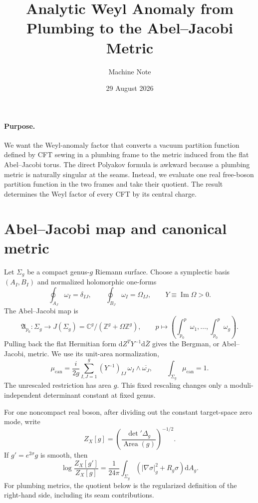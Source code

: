 \documentclass[11pt]{article}
\title{Analytic Weyl Anomaly from Plumbing to the Abel--Jacobi Metric}
\author{Machine Note}
\date{29 August 2026}
\newcommand{\dd}{\mathrm d}
\newcommand{\can}{\mathrm{can}}
\begin{document}
\maketitle

\paragraph{Purpose.}
We want the Weyl-anomaly factor that converts a vacuum partition function
defined by CFT sewing in a plumbing frame to the metric induced from the flat
Abel--Jacobi torus.  The direct Polyakov formula is awkward because a plumbing
metric is naturally singular at the seams.  Instead, we evaluate one real
free-boson partition function in the two frames and take their quotient.  The
result determines the Weyl factor of every CFT by its central charge.

\section{Abel--Jacobi map and canonical metric}

Let $\Sigma_g$ be a compact genus-$g$ Riemann surface.  Choose a symplectic
basis $(A_I,B_I)$ and normalized holomorphic one-forms
\begin{equation}
 \oint_{A_J}\omega_I=\delta_{IJ},
 \qquad
 \oint_{B_J}\omega_I=\Omega_{IJ},
 \qquad
 Y\equiv\operatorname{Im}\Omega>0.
\end{equation}
The Abel--Jacobi map is
\begin{equation}
 \mathfrak A_{p_0}:\Sigma_g\longrightarrow
 J(\Sigma_g)=\mathbb C^g/(\mathbb Z^g+\Omega\mathbb Z^g),
 \qquad
 p\longmapsto
 \left(\int_{p_0}^{p}\omega_1,\ldots,
       \int_{p_0}^{p}\omega_g\right).
\end{equation}
Pulling back the flat Hermitian form $\dd Z^T Y^{-1}\dd\bar Z$ gives the
Bergman, or Abel--Jacobi, metric.  We use its unit-area normalization,
\begin{equation}
 \boxed{
 \mu_{\can}
 =\frac{i}{2g}\sum_{I,J=1}^{g}
   (Y^{-1})_{IJ}\,\omega_I\wedge\overline{\omega_J},
 \qquad
 \int_{\Sigma_g}\mu_{\can}=1 .}
 \label{eq:canonical-metric}
\end{equation}
The unrescaled restriction has area $g$.  This fixed rescaling changes only a
moduli-independent determinant constant at fixed genus.

For one noncompact real boson, after dividing out the constant target-space
zero mode, write
\begin{equation}
 Z_X[g]=\left(\frac{\det{}'\Delta_g}{\operatorname{Area}(g)}\right)^{-1/2}.
 \label{eq:scalar-definition}
\end{equation}
If $g'=e^{2\sigma}g$ is smooth, then
\begin{equation}
 \log\frac{Z_X[g']}{Z_X[g]}
 =\frac{1}{24\pi}\int_{\Sigma_g}
 \left(|\nabla\sigma|_g^2+R_g\sigma\right)\dd A_g.
 \label{eq:polyakov}
\end{equation}
For plumbing metrics, the quotient below is the regularized definition of
the right-hand side, including its seam contributions.
\end{document}
